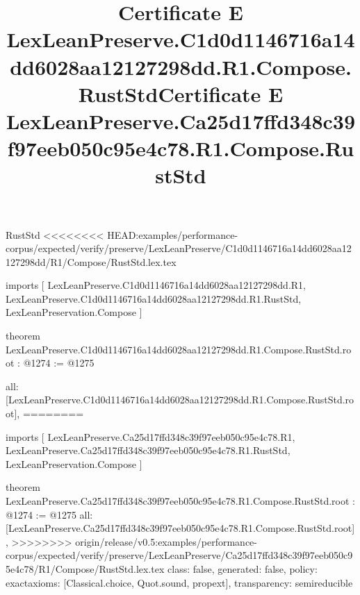 \begin{lexlean}{RustStd}
<<<<<<<< HEAD:examples/performance-corpus/expected/verify/preserve/LexLeanPreserve/C1d0d1146716a14dd6028aa12127298dd/R1/Compose/RustStd.lex.tex
\title{Certificate E LexLeanPreserve.C1d0d1146716a14dd6028aa12127298dd.R1.Compose.RustStd}
\begin{coremodule}
imports [
  LexLeanPreserve.C1d0d1146716a14dd6028aa12127298dd.R1,
  LexLeanPreserve.C1d0d1146716a14dd6028aa12127298dd.R1.RustStd,
  LexLeanPreservation.Compose
]

theorem LexLeanPreserve.C1d0d1146716a14dd6028aa12127298dd.R1.Compose.RustStd.root : @1274 := @1275 {
  all: [LexLeanPreserve.C1d0d1146716a14dd6028aa12127298dd.R1.Compose.RustStd.root],
========
\title{Certificate E LexLeanPreserve.Ca25d17ffd348c39f97eeb050c95e4c78.R1.Compose.RustStd}
\begin{coremodule}
imports [
  LexLeanPreserve.Ca25d17ffd348c39f97eeb050c95e4c78.R1,
  LexLeanPreserve.Ca25d17ffd348c39f97eeb050c95e4c78.R1.RustStd,
  LexLeanPreservation.Compose
]

theorem LexLeanPreserve.Ca25d17ffd348c39f97eeb050c95e4c78.R1.Compose.RustStd.root : @1274 := @1275 {
  all: [LexLeanPreserve.Ca25d17ffd348c39f97eeb050c95e4c78.R1.Compose.RustStd.root],
>>>>>>>> origin/release/v0.5:examples/performance-corpus/expected/verify/preserve/LexLeanPreserve/Ca25d17ffd348c39f97eeb050c95e4c78/R1/Compose/RustStd.lex.tex
  class: false,
  generated: false,
  policy: exact{axioms: [Classical.choice, Quot.sound, propext]},
  transparency: semireducible
}


\end{coremodule}}
\end{coremodule}
\end{lexlean}
